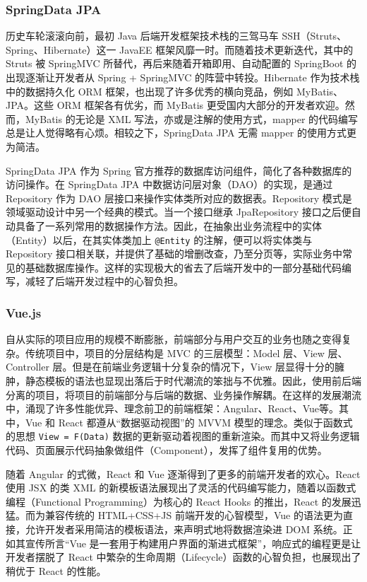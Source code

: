 \subsubsection{SpringData JPA}
历史车轮滚滚向前，最初 Java 后端开发框架技术栈的三驾马车 SSH（Struts、Spring、Hibernate）这一 JavaEE 框架风靡一时。而随着技术更新迭代，其中的 Struts 被 SpringMVC 所替代，再后来随着开箱即用、自动配置的 SpringBoot 的出现逐渐让开发者从 Spring + SpringMVC 的阵营中转投。Hibernate 作为技术栈中的数据持久化 ORM 框架，也出现了许多优秀的横向竞品，例如 MyBatis、JPA。这些 ORM 框架各有优劣，而 MyBatis 更受国内大部分的开发者欢迎。然而，MyBatis 的无论是 XML 写法，亦或是注解的使用方式，mapper 的代码编写总是让人觉得略有心烦。相较之下，SpringData JPA 无需 mapper 的使用方式更为简洁。

SpringData JPA 作为 Spring 官方推荐的数据库访问组件，简化了各种数据库的访问操作。在 SpringData JPA 中数据访问层对象（DAO）的实现，是通过 Repository 作为 DAO 层接口来操作实体类所对应的数据表。Repository 模式是领域驱动设计中另一个经典的模式。当一个接口继承 JpaRepository 接口之后便自动具备了一系列常用的数据操作方法。因此，在抽象出业务流程中的实体（Entity）以后，在其实体类加上  \lstinline!@Entity! 的注解，便可以将实体类与 Repository 接口相关联，并提供了基础的增删改查，乃至分页等，实际业务中常见的基础数据库操作。这样的实现极大的省去了后端开发中的一部分基础代码编写，减轻了后端开发过程中的心智负担。

\subsubsection{Vue.js}
自从实际的项目应用的规模不断膨胀，前端部分与用户交互的业务也随之变得复杂。传统项目中，项目的分层结构是 MVC 的三层模型：Model 层、View 层、Controller 层。但是在前端业务逻辑十分复杂的情况下，View 层显得十分的臃肿，静态模板的语法也显现出落后于时代潮流的笨拙与不优雅。因此，使用前后端分离的项目，将项目的前端部分与后端的数据、业务操作解耦。在这样的发展潮流中，涌现了许多性能优异、理念前卫的前端框架：Angular、React、Vue等。其中，Vue 和 React 都遵从“数据驱动视图”的 MVVM 模型的理念。类似于函数式的思想 \lstinline!View = F(Data)! 数据的更新驱动着视图的重新渲染。而其中又将业务逻辑代码、页面展示代码抽象做组件（Component），发挥了组件复用的优势。

随着 Angular 的式微，React 和 Vue 逐渐得到了更多的前端开发者的欢心。React 使用 JSX 的类 XML 的新模板语法展现出了灵活的代码编写能力，随着以函数式编程（Functional Programming）为核心的 React Hooks 的推出，React 的发展迅猛。而为兼容传统的 HTML+CSS+JS 前端开发的心智模型，Vue 的语法更为直接，允许开发者采用简洁的模板语法，来声明式地将数据渲染进 DOM 系统。正如其宣传所言“Vue 是一套用于构建用户界面的渐进式框架”，响应式的编程更是让开发者摆脱了 React 中繁杂的生命周期（Lifecycle）函数的心智负担，也展现出了稍优于 React 的性能。

